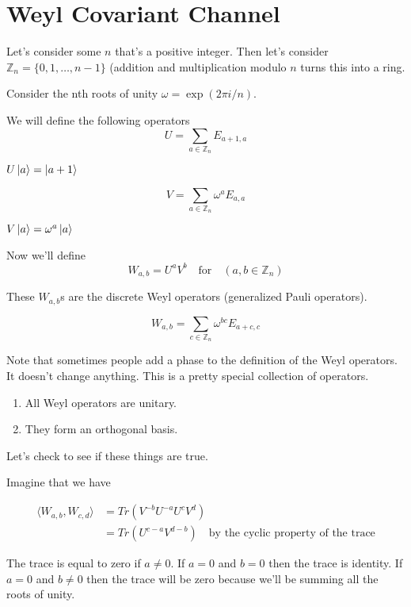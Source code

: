 \documentclass{article}
\begin{document}
\section*{Weyl Covariant Channel}
Let's consider some $n$ that's a positive integer. Then let's consider
$\mathbb{Z}_n = \{0,1,\ldots,n-1\}$ (addition and multiplication modulo $ n
    $ turns this into a ring.

    Consider the nth roots of unity $\omega = \exp(2\pi i/n)$.

    We will define the following operators 
    \[
            U = \sum\limits_{a \in \mathbb{Z}_n} E_{a+1,a}
    \]
    
    $ U \ket{a} = \ket{a+1}$

    \[ 
            V = \sum\limits_{a \in \mathbb{Z}_n} \omega^a E_{a,a} 
    \]
    
    $ V \ket{a} = \omega^a \ket{a}$

    Now we'll define $$ W_{a,b} = U^a V^b \quad \text{for} \quad (a,b \in
    \mathbb{Z}_n)$$

    These $W_{a,b}$s are the discrete Weyl operators (generalized Pauli
    operators).

    $$ W_{a,b} = \sum\limits_{c \in \mathbb{Z}_n} \omega^{bc} E_{a+c,c} $$

    Note that sometimes people add a phase to the definition of the Weyl
    operators. It doesn't change anything. This is a pretty special collection
    of operators.

    \begin{enumerate}
        \item All Weyl operators are unitary.
        \item They form an orthogonal basis.
    \end{enumerate}

    Let's check to see if these things are true.

    Imagine that we have 
    
    \begin{align*}
        \langle W_{a,b} , W_{c,d}\rangle &= Tr(V^{-b} U^{-a} U^c
    V^d) \\	
    &=Tr(U^{c-a}V^{d-b}) \quad \text{by the cyclic property of the
        trace}
    \end{align*}

        The trace is equal to zero if $a \ne 0$. If $a=0$ and $b = 0$ then the
        trace is identity. If $a = 0$ and $b\ne0$ then the trace will be zero
        because we'll be summing all the roots of unity.
\end{document}
